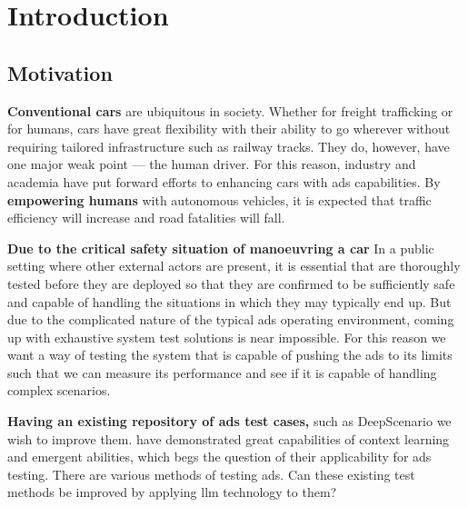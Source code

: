 \chapter*{Introduction}


\section{Motivation}

\textbf{Conventional cars} are ubiquitous in society. Whether for freight trafficking or for humans, cars have great flexibility with their ability to go wherever without requiring tailored infrastructure
such as railway tracks. They do, however, have one major weak point --- the human driver. For this
reason, industry and academia have put forward efforts to enhancing cars with \acrfull{ads}
capabilities.
By \textbf{empowering humans} with autonomous vehicles, it is expected that traffic efficiency will
increase and road fatalities will fall.

\textbf{Due to the critical safety situation of manoeuvring a car} In a public setting where other external
actors are present, it is essential that  are thoroughly tested before they are
deployed so that they are confirmed to be sufficiently safe and capable of handling the situations in which
they may typically end up.
But due to the complicated nature of the typical \acrshort{ads} operating environment, coming up with
exhaustive system test solutions is near impossible.
For this reason we want a way of testing the system that is capable of pushing the \acrlong{ads} to
its limits such that we can measure its performance and see if it is capable of
handling complex scenarios.

\textbf{Having an existing repository of \acrlong{ads} test cases,} such as
DeepScenario we wish to improve them. \textbf{} have demonstrated
great capabilities of context learning and emergent abilities, which begs
the question of their  applicability for \acrshort{ads} testing.  There are
various methods of testing  \acrlong{ads}. Can these existing test methods be
improved by applying \acrshort{llm} technology to them?


